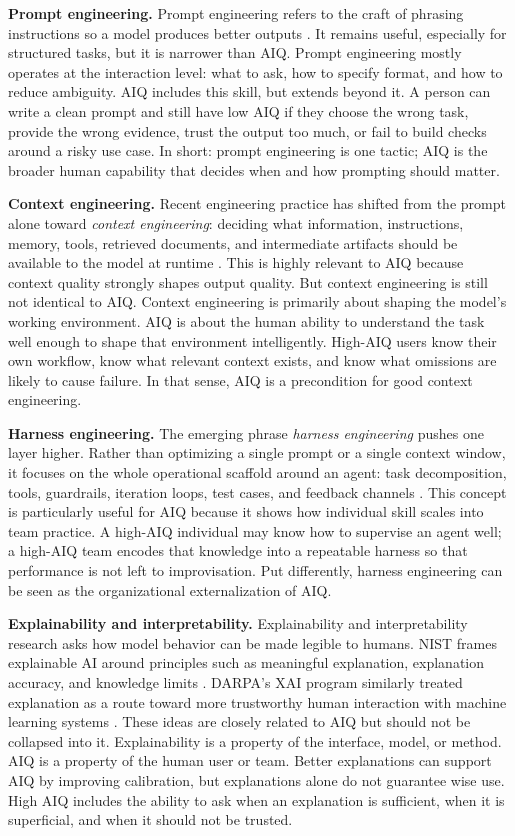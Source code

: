 \documentclass[10pt]{article}
\begin{document}
\textbf{Prompt engineering.}
Prompt engineering refers to the craft of phrasing instructions so a model produces better outputs \cite{openai2026prompt}. It remains useful, especially for structured tasks, but it is narrower than AIQ. Prompt engineering mostly operates at the interaction level: what to ask, how to specify format, and how to reduce ambiguity. AIQ includes this skill, but extends beyond it. A person can write a clean prompt and still have low AIQ if they choose the wrong task, provide the wrong evidence, trust the output too much, or fail to build checks around a risky use case. In short: prompt engineering is one tactic; AIQ is the broader human capability that decides when and how prompting should matter.

\textbf{Context engineering.}
Recent engineering practice has shifted from the prompt alone toward \emph{context engineering}: deciding what information, instructions, memory, tools, retrieved documents, and intermediate artifacts should be available to the model at runtime \cite{anthropic2025context}. This is highly relevant to AIQ because context quality strongly shapes output quality. But context engineering is still not identical to AIQ. Context engineering is primarily about shaping the model's working environment. AIQ is about the human ability to understand the task well enough to shape that environment intelligently. High-AIQ users know their own workflow, know what relevant context exists, and know what omissions are likely to cause failure. In that sense, AIQ is a precondition for good context engineering.

\textbf{Harness engineering.}
The emerging phrase \emph{harness engineering} pushes one layer higher. Rather than optimizing a single prompt or a single context window, it focuses on the whole operational scaffold around an agent: task decomposition, tools, guardrails, iteration loops, test cases, and feedback channels \cite{hashimoto2026harness,openai2026harness,boeckeler2026harness}. This concept is particularly useful for AIQ because it shows how individual skill scales into team practice. A high-AIQ individual may know how to supervise an agent well; a high-AIQ team encodes that knowledge into a repeatable harness so that performance is not left to improvisation. Put differently, harness engineering can be seen as the organizational externalization of AIQ.

\textbf{Explainability and interpretability.}
Explainability and interpretability research asks how model behavior can be made legible to humans. NIST frames explainable AI around principles such as meaningful explanation, explanation accuracy, and knowledge limits \cite{phillips2021xai}. DARPA's XAI program similarly treated explanation as a route toward more trustworthy human interaction with machine learning systems \cite{darpaXAI}. These ideas are closely related to AIQ but should not be collapsed into it. Explainability is a property of the interface, model, or method. AIQ is a property of the human user or team. Better explanations can support AIQ by improving calibration, but explanations alone do not guarantee wise use. High AIQ includes the ability to ask when an explanation is sufficient, when it is superficial, and when it should not be trusted.
\end{document}
